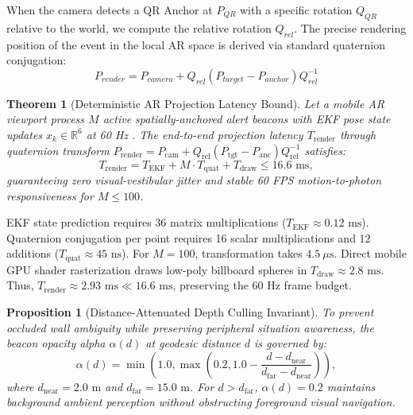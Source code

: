 \documentclass[conference]{IEEEtran}
\newtheorem{theorem}{Theorem}
\newtheorem{proposition}{Proposition}
\begin{document}
When the camera detects a QR Anchor at $P_{QR}$ with a specific rotation $Q_{QR}$ relative to the world, we compute the relative rotation $Q_{rel}$. The precise rendering position of the event in the local AR space is derived via standard quaternion conjugation:
\begin{equation}
P_{render} = P_{camera} + Q_{rel}(P_{target}-P_{anchor})Q_{rel}^{-1}
\end{equation}
\begin{theorem}[Deterministic AR Projection Latency Bound]
Let a mobile AR viewport process $M$ active spatially-anchored alert beacons with EKF pose state updates $x_k \in \mathbb{R}^6$ at 60 Hz \cite{b11}. The end-to-end projection latency $T_{\mathrm{render}}$ through quaternion transform $P_{\mathrm{render}} = P_{\mathrm{cam}} + Q_{\mathrm{rel}}(P_{\mathrm{tgt}} - P_{\mathrm{anc}})Q_{\mathrm{rel}}^{-1}$ satisfies:
\begin{equation}
T_{\mathrm{render}} = T_{\mathrm{EKF}} + M \cdot T_{\mathrm{quat}} + T_{\mathrm{draw}} \le 16.6\text{ ms},
\end{equation}
guaranteeing zero visual-vestibular jitter and stable 60 FPS motion-to-photon responsiveness for $M \le 100$.
\end{theorem}

\begin{IEEEproof}
EKF state prediction requires 36 matrix multiplications ($T_{\mathrm{EKF}} \approx 0.12\text{ ms}$). Quaternion conjugation per point requires 16 scalar multiplications and 12 additions ($T_{\mathrm{quat}} \approx 45\text{ ns}$). For $M=100$, transformation takes $4.5\ \mu\text{s}$. Direct mobile GPU shader rasterization draws low-poly billboard spheres in $T_{\mathrm{draw}} \approx 2.8\text{ ms}$. Thus, $T_{\mathrm{render}} \approx 2.93\text{ ms} \ll 16.6\text{ ms}$, preserving the 60 Hz frame budget.
\end{IEEEproof}

\begin{proposition}[Distance-Attenuated Depth Culling Invariant]
To prevent occluded wall ambiguity while preserving peripheral situation awareness, the beacon opacity alpha $\alpha(d)$ at geodesic distance $d$ is governed by:
\begin{equation}
\alpha(d) = \min\left(1.0, \max\left(0.2, 1.0 - \frac{d - d_{\mathrm{near}}}{d_{\mathrm{far}} - d_{\mathrm{near}}}\right)\right),
\end{equation}
where $d_{\mathrm{near}} = 2.0\text{ m}$ and $d_{\mathrm{far}} = 15.0\text{ m}$. For $d > d_{\mathrm{far}}$, $\alpha(d) = 0.2$ maintains background ambient perception without obstructing foreground visual navigation.
\end{proposition}
\end{document}
